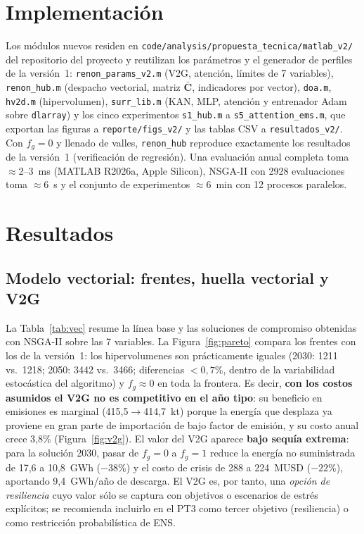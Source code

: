 \documentclass[11pt,a4paper]{article}
\newcommand{\vect}[1]{\bm{#1}}
\begin{document}
\section{Implementaci\'on}
Los m\'odulos nuevos residen en \texttt{code/analysis/propuesta\_tecnica/matlab\_v2/} del
repositorio del proyecto y reutilizan los
par\'ametros y el generador de perfiles de la versi\'on~1:
\texttt{renon\_params\_v2.m} (V2G, atenci\'on, l\'imites de 7 variables),
\texttt{renon\_hub.m} (despacho vectorial, matriz $\bar{\vect{C}}$, indicadores por
vector), \texttt{doa.m}, \texttt{hv2d.m} (hipervolumen), \texttt{surr\_lib.m} (KAN, MLP,
atenci\'on y entrenador Adam sobre \texttt{dlarray}) y los cinco experimentos
\texttt{s1\_hub.m} a \texttt{s5\_attention\_ems.m}, que exportan las figuras a
\texttt{reporte/figs\_v2/} y las tablas CSV a \texttt{resultados\_v2/}. Con
$f_g=0$ y llenado de valles, \texttt{renon\_hub} reproduce exactamente los resultados de
la versi\'on~1 (verificaci\'on de regresi\'on). Una evaluaci\'on anual completa toma
$\approx$2--3~ms (MATLAB R2026a, Apple Silicon), NSGA-II con 2928 evaluaciones toma
$\approx$6~s y el conjunto de experimentos $\approx$6~min con 12 procesos paralelos.

\section{Resultados}
\subsection{Modelo vectorial: frentes, huella vectorial y V2G}
La Tabla~\ref{tab:vec} resume la l\'inea base y las soluciones de compromiso obtenidas con
NSGA-II sobre las 7 variables. La Figura~\ref{fig:pareto} compara los frentes con los de la
versi\'on~1: los hipervolumenes son pr\'acticamente iguales (2030: 1211 vs.\ 1218; 2050:
3442 vs.\ 3466; diferencias $<0{,}7\%$, dentro de la variabilidad estoc\'astica del
algoritmo) y $f_g\approx0$ en toda la frontera. Es decir, \textbf{con los costos
asumidos el V2G no es competitivo en el a\~no tipo}: su beneficio en emisiones es
marginal (415,5$\to$414,7~kt) porque la energ\'ia que desplaza ya proviene en gran parte de
importaci\'on de bajo factor de emisi\'on, y su costo anual crece 3,8\% (Figura~\ref{fig:v2g}).
El valor del V2G aparece \textbf{bajo sequ\'ia extrema}: para la soluci\'on 2030, pasar de
$f_g=0$ a $f_g=1$ reduce la energ\'ia no suministrada de 17,6 a 10,8~GWh ($-38\%$) y el
costo de crisis de 288 a 224~MUSD ($-22\%$), aportando 9,4~GWh/a\~no de descarga. El V2G
es, por tanto, una \emph{opci\'on de resiliencia} cuyo valor s\'olo se captura con
objetivos o escenarios de estr\'es expl\'icitos; se recomienda incluirlo en el PT3 como
tercer objetivo (resiliencia) o como restricci\'on probabil\'istica de ENS.
\end{document}
